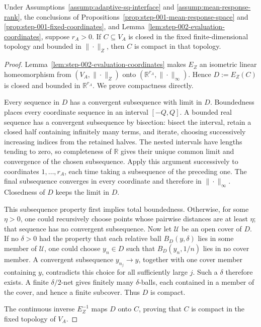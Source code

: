 \begin{lemma}
\label{lem:step-002-heine-borel}
Under Assumptions~\ref{assump:adaptive-sq-interface} and
\ref{assump:mean-response-rank}, the conclusions of
Propositions~\ref{prop:step-001-mean-response-space} and
\ref{prop:step-001-fixed-coordinates}, and
Lemma~\ref{lem:step-002-evaluation-coordinates}, suppose \(r_A>0\).  If
\(C\subseteq V_A\) is closed in the fixed finite-dimensional topology and
bounded in \(\|\cdot\|_Z\), then \(C\) is compact in that topology.
\end{lemma}

\begin{proof}
Lemma~\ref{lem:step-002-evaluation-coordinates} makes \(E_Z\) an isometric
linear homeomorphism from \((V_A,\|\cdot\|_Z)\) onto
\((\mathbb R^{r_A},\|\cdot\|_\infty)\).  Hence \(D:=E_Z(C)\) is closed and
bounded in \(\mathbb R^{r_A}\).  We prove compactness directly.

Every sequence in \(D\) has a convergent subsequence with limit in \(D\).
Boundedness places every coordinate sequence in an interval \([-Q,Q]\).  A
bounded real sequence has a convergent subsequence by bisection: bisect the
interval, retain a closed half containing infinitely many terms, and iterate,
choosing successively increasing indices from the retained halves.  The
nested intervals have lengths tending to zero, so completeness of
\(\mathbb R\) gives their unique common limit and convergence of the chosen
subsequence.  Apply this argument successively to coordinates
\(1,\ldots,r_A\), each time taking a subsequence of the preceding one.  The
final subsequence converges in every coordinate and therefore in
\(\|\cdot\|_\infty\).  Closedness of \(D\) keeps the limit in \(D\).

This subsequence property first implies total boundedness.  Otherwise, for
some \(\eta>0\), one could recursively choose points whose pairwise distances
are at least \(\eta\); that sequence has no convergent subsequence.  Now let
\(\mathcal U\) be an open cover of \(D\).  If no \(\delta>0\) had the
property that each relative ball \(B_D(y,\delta)\) lies in some member of
\(\mathcal U\), one could choose \(y_n\in D\) such that
\(B_D(y_n,1/n)\) lies in no cover member.  A convergent subsequence
\(y_{n_j}\to y\), together with one cover member containing \(y\),
contradicts this choice for all sufficiently large \(j\).  Such a
\(\delta\) therefore exists.  A finite \(\delta/2\)-net gives finitely many
\(\delta\)-balls, each contained in a member of the cover, and hence a finite
subcover.  Thus \(D\) is compact.

The continuous inverse \(E_Z^{-1}\) maps \(D\) onto \(C\), proving that
\(C\) is compact in the fixed topology of \(V_A\).
\end{proof}

